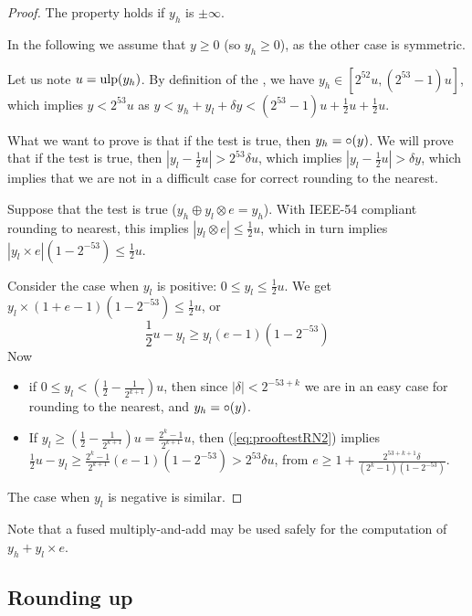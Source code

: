 \begin{proof}
  The property holds if $y_h$ is $\pm \infty$.
  
  In the following we assume that $y\ge0$ (so $y_h\ge0$), as the other
  case is symmetric.
  
  Let us note $u=\mbox{ulp}(y_h)$. By definition of the \ulp, we have $y_h
  \in [2^{52}u, (2^{53}-1)u]$, which implies $y<2^{53}u$ as $y < y_h + y_l + \delta y
  < (2^{53}-1)u +\frac{1}{2}u +\frac{1}{2}u$.

  
  What we want to prove is that if the test is true, then $y_h =
  \circ(y)$. We will prove that  if the test is true, then $|y_l-\frac{1}{2}u| > 2^{53}\delta
  u$, which implies $|y_l-\frac{1}{2}u| > \delta y$, which implies
  that we are not in a difficult case for correct rounding to the
  nearest.

  Suppose that the test is true ($y_h \oplus y_l \otimes e = y_h$). 
  With IEEE-54 compliant rounding to
  nearest, this implies $|y_l \otimes e|
  \le \frac{1}{2}u$, which in turn implies $|y_l \times e|
  (1-2^{-53}) \le \frac{1}{2}u$. 
  
  Consider the case when $y_l$ is positive:  $0\le y_l \le \frac{1}{2}u$.
  We get $y_l \times (1+e-1)(1-2^{-53}) \le \frac{1}{2}u$, or
  \begin{equation}
  \frac{1}{2}u - y_l \ge y_l (e-1)(1-2^{-53})\label{eq:prooftestRN2}
  \end{equation}  
  Now
  \begin{itemize}
  \item if $0 \le y_l < (\frac{1}{2} - \frac{1}{2^{k+1}})u$, then since
    $|\delta|<2^{-53+k}$ we are in an easy case for rounding to the
    nearest, and $y_h = \circ(y)$.
  \item If $y_l \ge (\frac{1}{2} - \frac{1}{2^{k+1}})u =
    \frac{2^{k}-1}{2^{k+1}}u$, then (\ref{eq:prooftestRN2}) implies
    $\frac{1}{2}u - y_l \ge \frac{2^{k}-1}{2^{k+1}} (e-1)(1-2^{-53}) >
    2^{53}\delta u$, from $e\ge 1+
    \frac{2^{53+k+1}\delta}{(2^{k}-1)(1-2^{-53})}$.
\end{itemize}  
  The case when $y_l$ is negative is similar.
\end{proof}

 Note that a fused multiply-and-add may be used safely for the
 computation of $y_h+y_l\times e$.




\subsection{Rounding up}

